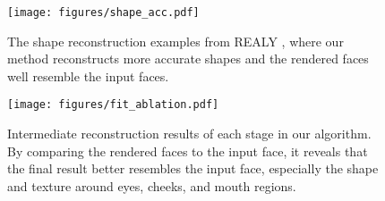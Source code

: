 \documentclass[10pt,twocolumn,letterpaper]{article}
\begin{document}
\begin{table}[!t]
\caption{Quantitative comparison of 3D face reconstruction on the RELAY benchmark~\cite{chai2022realy}.  denotes the results reported from~\cite{chai2022realy}. ``FS" stands for Facescape dataset~\cite{yang2020facescape}.}
\label{tab:recons-realy}
\footnotesize
{}
\end{table} 
\begin{figure}[!t]
  \centering
   \texttt{[image: figures/shape\_acc.pdf]}
   \caption{The shape reconstruction examples from REALY \cite{chai2022realy}, where our method reconstructs more accurate shapes and the rendered faces well resemble the input faces.}
   \label{fig:shape-acc}
\end{figure}


\begin{figure}[!t]
  \centering
   \texttt{[image: figures/fit\_ablation.pdf]}
   \caption{Intermediate reconstruction results of each stage in our algorithm. By comparing the rendered faces to the input face, it reveals that the final result better resembles the input face, especially the shape and texture around eyes, cheeks, and mouth regions.}
   \label{fig:fit-ablation}
\end{figure}
\end{document}
